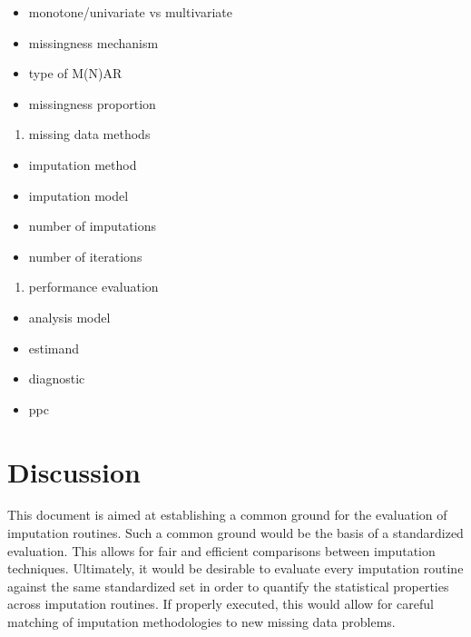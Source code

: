 \documentclass[
]{article}
\providecommand{\tightlist}{%
  \setlength{\itemsep}{0pt}\setlength{\parskip}{0pt}}
\begin{document}
\begin{itemize}
\tightlist
\item
  monotone/univariate vs multivariate
\item
  missingness mechanism
\item
  type of M(N)AR
\item
  missingness proportion
\end{itemize}

\begin{enumerate}
\def\labelenumi{\arabic{enumi}.}
\setcounter{enumi}{3}
\tightlist
\item
  missing data methods
\end{enumerate}

\begin{itemize}
\tightlist
\item
  imputation method
\item
  imputation model
\item
  number of imputations
\item
  number of iterations
\end{itemize}

\begin{enumerate}
\def\labelenumi{\arabic{enumi}.}
\setcounter{enumi}{4}
\tightlist
\item
  performance evaluation
\end{enumerate}

\begin{itemize}
\tightlist
\item
  analysis model
\item
  estimand
\item
  diagnostic
\item
  ppc
\end{itemize}

\hypertarget{discussion}{%
\section{Discussion}\label{discussion}}

This document is aimed at establishing a common ground for the
evaluation of imputation routines. Such a common ground would be the
basis of a standardized evaluation. This allows for fair and efficient
comparisons between imputation techniques. Ultimately, it would be
desirable to evaluate every imputation routine against the same
standardized set in order to quantify the statistical properties across
imputation routines. If properly executed, this would allow for careful
matching of imputation methodologies to new missing data problems.
\end{document}
